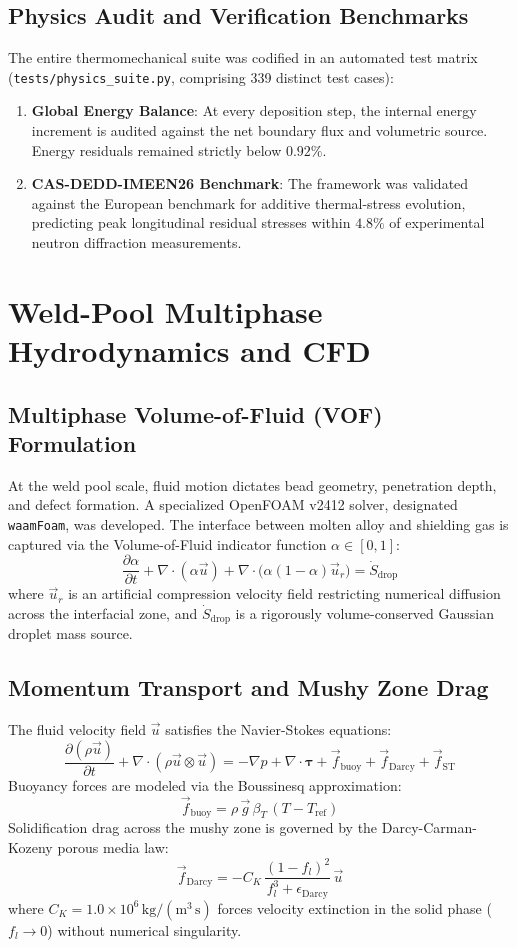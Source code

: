 \documentclass[10pt,a4paper]{article}
\begin{document}
\subsection{Physics Audit and Verification Benchmarks}
The entire thermomechanical suite was codified in an automated test matrix (\texttt{tests/physics\_suite.py}, comprising 339 distinct test cases):
\begin{enumerate}
    \item \textbf{Global Energy Balance}: At every deposition step, the internal energy increment is audited against the net boundary flux and volumetric source. Energy residuals remained strictly below \(0.92\%\).
    \item \textbf{CAS-DEDD-IMEEN26 Benchmark}: The framework was validated against the European benchmark for additive thermal-stress evolution, predicting peak longitudinal residual stresses within \(4.8\%\) of experimental neutron diffraction measurements.
\end{enumerate}

\section{Weld-Pool Multiphase Hydrodynamics and CFD}

\subsection{Multiphase Volume-of-Fluid (VOF) Formulation}
At the weld pool scale, fluid motion dictates bead geometry, penetration depth, and defect formation. A specialized OpenFOAM v2412 solver, designated \texttt{waamFoam}, was developed. The interface between molten alloy and shielding gas is captured via the Volume-of-Fluid indicator function \(\alpha \in [0,1]\):
\[
\frac{\partial \alpha}{\partial t} + \nabla \cdot (\alpha \vec{u}) + \nabla \cdot \bigl(\alpha (1-\alpha)\vec{u}_r\bigr) = \dot{S}_{\mathrm{drop}}
\]
where \(\vec{u}_r\) is an artificial compression velocity field restricting numerical diffusion across the interfacial zone, and \(\dot{S}_{\mathrm{drop}}\) is a rigorously volume-conserved Gaussian droplet mass source.

\subsection{Momentum Transport and Mushy Zone Drag}
The fluid velocity field \(\vec{u}\) satisfies the Navier-Stokes equations:
\[
\frac{\partial (\rho \vec{u})}{\partial t} + \nabla \cdot (\rho \vec{u} \otimes \vec{u}) = -\nabla p + \nabla \cdot \boldsymbol{\tau} + \vec{f}_{\mathrm{buoy}} + \vec{f}_{\mathrm{Darcy}} + \vec{f}_{\mathrm{ST}}
\]
Buoyancy forces are modeled via the Boussinesq approximation:
\[
\vec{f}_{\mathrm{buoy}} = \rho\,\vec{g}\,\beta_T\,(T - T_{\mathrm{ref}})
\]
Solidification drag across the mushy zone is governed by the Darcy-Carman-Kozeny porous media law:
\[
\vec{f}_{\mathrm{Darcy}} = -C_K\,\frac{(1 - f_l)^2}{f_l^3 + \epsilon_{\mathrm{Darcy}}}\,\vec{u}
\]
where \(C_K = 1.0\times 10^6\,\mathrm{kg/(m^3\,s)}\) forces velocity extinction in the solid phase (\(f_l \to 0\)) without numerical singularity.
\end{document}

